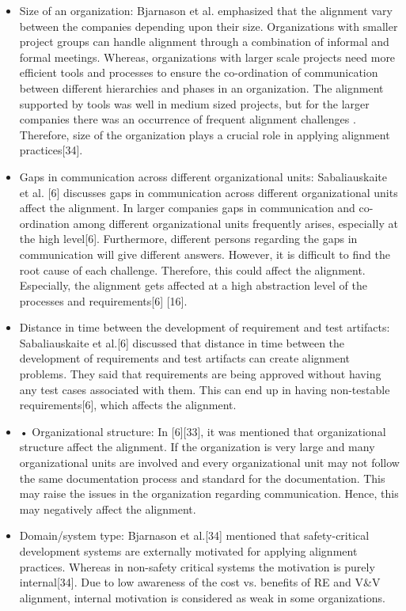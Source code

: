 \documentclass{article}
\begin{document}
\begin{itemize}
    \item Size of an organization: Bjarnason et al. \cite{bjarnason2014challengesS9} emphasized that the alignment vary between the companies depending upon their size. Organizations with smaller project groups can handle alignment through a combination of informal and formal meetings. Whereas, organizations with larger scale projects need more efficient tools and processes to ensure the co-ordination of communication between different hierarchies and phases in an organization\cite{bjarnason2014challengesS9}. The alignment supported by tools was well in medium sized projects, but for the larger companies there was an occurrence of frequent alignment challenges \cite{kukkanen2009applyingS2}. Therefore, size of the organization plays a crucial role in applying alignment practices[34].
    \item Gaps in communication across different organizational units: Sabaliauskaite et al. [6] discusses gaps in communication across different organizational units affect the alignment. In larger companies gaps in communication and co-ordination among different organizational units frequently arises, especially at the high level[6]. Furthermore, different persons regarding the gaps in communication will give different answers. However, it is difficult to find the root cause of each challenge. Therefore, this could affect the alignment. Especially, the alignment gets affected at a high abstraction level of the processes and requirements[6] [16].
    \item Distance in time between the development of requirement and test artifacts: Sabaliauskaite et al.[6] discussed that distance in time between the development of requirements and test artifacts can create alignment problems. They said that requirements are being approved without having any test cases associated with them. This can end up in having non-testable requirements[6], which affects the alignment. 
    \item •	Organizational structure: In [6]\cite{bjarnason2014challengesS9}[33], it was mentioned that organizational structure affect the alignment. If the organization is very large and many organizational units are involved and every organizational unit may not follow the same documentation process and standard for the documentation. This may raise the issues in the organization regarding communication. Hence, this may negatively affect the alignment.
    \item Domain/system type: Bjarnason et al.[34] mentioned that safety-critical development systems are externally motivated for applying alignment practices. Whereas in non-safety critical systems the motivation is purely internal[34]. Due to low awareness of the cost vs. benefits of RE and V&V alignment, internal motivation is considered as weak in some organizations.
\end{itemize}
\end{document}
